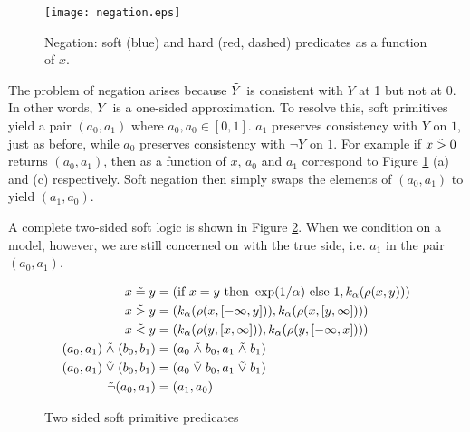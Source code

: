 \begin{figure}
\texttt{[image: negation.eps]}
\caption{Negation: soft (blue) and hard (red, dashed) predicates as a function of $x$.  }\label{negationimg}
\end{figure}


The problem of negation arises because $\tilde{Y}$ is consistent with $Y$ at 1 but not at 0.
In other words, $\tilde{Y}$ is a one-sided approximation.
To resolve this, soft primitives yield a pair $(a_0, a_1)$ where $a_0, a_0 \in [0, 1]$.
$a_1$ preserves consistency with $Y$ on $1$, just as before, while $a_0$ preserves consistency with $\neg Y$ on $1$.
For example if $x \mathrel{\tilde{>}} 0$ returns $(a_0, a_1)$, then as a function of $x$, $a_0$ and $a_1$ correspond to Figure \ref{negationimg} (a) and (c) respectively.
Soft negation then simply swaps the elements of $(a_0, a_1)$ to yield $(a_1, a_0)$.

A complete two-sided soft logic is shown in Figure \ref{softw}.
When we condition on a model, however, we are still concerned on with the true side, i.e. $a_1$ in the pair $(a_0, a_1)$.




\begin{figure}
\begin{align*}
x \mathrel{\tilde{=}} y &= (\text{if } x = y  \text{ then } \exp(1/\alpha) \text{ else } 1, k_\alpha(\rho(x, y)))\\
x \mathrel{\tilde{>}} y &= (k_\alpha(\rho(x, [-\infty, y])), k_\alpha(\rho(x, [y, \infty])))\\
x \mathrel{\tilde{<}} y &= (k_\alpha(\rho(y, [x, \infty])), k_\alpha(\rho(y, [-\infty, x])))\\
(a_0, a_1) \mathrel{\tilde{\land}} (b_0, b_1) &= (a_0 \mathrel{\tilde{\land}} b_0, a_1 \mathrel{\tilde{\land}} b_1)\\
(a_0, a_1) \mathrel{\tilde{\lor}} (b_0, b_1) &= (a_0 \mathrel{\tilde{\lor}} b_0, a_1 \mathrel{\tilde{\lor}} b_1)\\
\tilde{\neg}(a_0, a_1) &= (a_1, a_0)
\end{align*}
\caption{Two sided soft primitive predicates}
\label{softw}
\end{figure}

